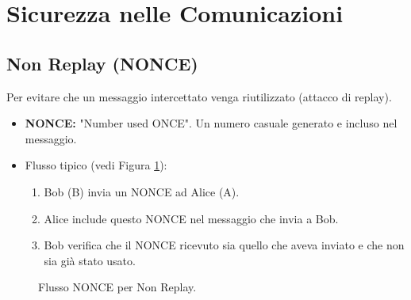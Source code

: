 \section{Sicurezza nelle Comunicazioni}

\subsection{Non Replay (NONCE)}
Per evitare che un messaggio intercettato venga riutilizzato (attacco di replay).
\begin{itemize}
    \item \textbf{NONCE:} "Number used ONCE". Un numero casuale generato e incluso nel messaggio.
    \item Flusso tipico (vedi Figura \ref{fig:nonce_flow}):
    \begin{enumerate}
        \item Bob (B) invia un NONCE ad Alice (A).
        \item Alice include questo NONCE nel messaggio che invia a Bob.
        \item Bob verifica che il NONCE ricevuto sia quello che aveva inviato e che non sia già stato usato.
    \end{enumerate}
\end{itemize}

\begin{figure}[H]
\centering
{}
\caption{Flusso NONCE per Non Replay.}
\label{fig:nonce_flow}
\end{figure}

